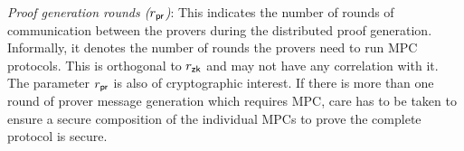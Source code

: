 \noindent\textit{Proof generation rounds ($r_\mathsf{pr}$)}:
This indicates the number of rounds of communication between the provers during
the distributed proof generation. Informally, it denotes the number of rounds the provers need to run MPC protocols. %
 This is orthogonal  to $r_\mathsf{zk}$ and may not have any correlation with it. %
The parameter $r_\mathsf{pr}$ is also of cryptographic interest. If there is more than one round of prover message generation which requires MPC, care has to be taken to ensure a secure composition of the individual MPCs to prove the complete protocol is secure.


